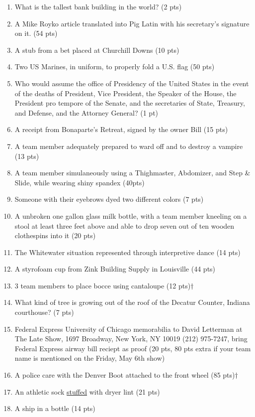 \begin{enumerate}
\item What is the tallest bank building in the world? (2 pts)
\item A Mike Royko article translated into Pig Latin with his secretary's signature on it. (54 pts)
\item A stub from a bet placed at Churchill Downs (10 pts)
\item Two US Marines, in uniform, to properly fold a U.S. flag (50 pts)
\item Who would assume the office of Presidency of the United States in the event of the deaths of President, Vice President, the Speaker of the House, the President pro tempore of the Senate, and the secretaries of State, Treasury, and Defense, and the Attorney General? (1 pt)
\item A receipt from Bonaparte's Retreat, signed by the owner Bill (15 pts)
\item A team member adequately prepared to ward off and to destroy a vampire (13 pts)
\item A team member simulaneously using a Thighmaster{\texttrademark}, Abdomizer{\texttrademark}, and Step \& Slide{\texttrademark}, while wearing shiny spandex (40pts)
\item Someone with their eyebrows dyed two different colors (7 pts)
\item A unbroken one gallon glass milk bottle, with a team member kneeling on a stool at least three feet above and able to drop seven out of ten wooden clothespins into it (20 pts)
\item The Whitewater situation represented through interpretive dance (14 pts)
\item A styrofoam cup from Zink Building Supply in Louisville (44 pts)
\item 3 team members to place bocce using cantaloupe (12 pts)$\dagger$
\item What kind of tree is growing out of the roof of the Decatur Counter, Indiana courthouse? (7 pts)
\item Federal Express University of Chicago memorabilia to David Letterman at The Late Show, 1697 Broadway, New York, NY 10019 (212) 975-7247, bring Federal Express airway bill reciept as proof (20 pts, 80 pts extra if your team name is mentioned on the Friday, May 6th show)
\item A police care with the Denver Boot attached to the front wheel (85 pts)$\dagger$
\item An athletic sock \underline{stuffed} with dryer lint (21 pts)
\item A ship in a bottle (14 pts)

\end{enumerate}
